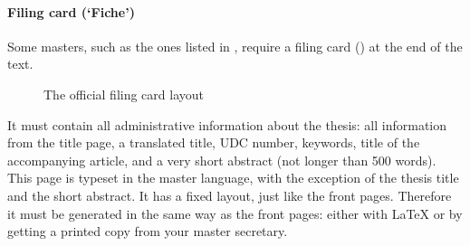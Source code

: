 \documentclass[11pt,article,oneside,a4paper]{memoir}
\newcommand\Dutch[1]{`\foreignlanguage{dutch}{#1}'}
\begin{document}
\paragraph{Filing card (\Dutch{Fiche})} Some masters, such as the ones
listed in , require a filing card () at the
end of the text.
\begin{figure}
  \centering \fboxsep=0pt
  \caption{The official filing card layout}
  \label{fig:fiche}
\end{figure}
It must contain all administrative information about the thesis: all
information from the title page, a translated title, UDC number, keywords,
title of the accompanying article, and a very short abstract (not longer
than 500 words). This page is typeset in the master language, with the
exception of the thesis title and the short abstract. It has a fixed
layout, just like the front pages. Therefore it must be generated in the
same way as the front pages: either with LaTeX or by getting a printed copy
from your master secretary.
\end{document}
